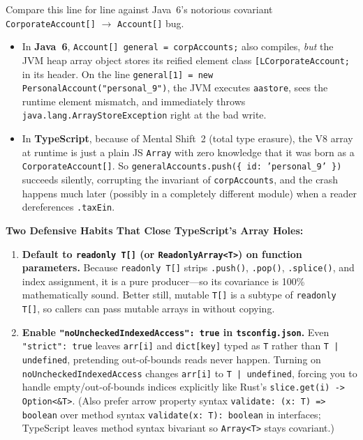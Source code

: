 Compare this line for line against Java~6's notorious covariant \texttt{CorporateAccount[]} $\to$ \texttt{Account[]} bug.
\begin{itemize}
  \item In \textbf{Java~6}, \texttt{Account[] general = corpAccounts;} also compiles, \emph{but} the JVM heap array object stores its reified element class \texttt{[LCorporateAccount;} in its header. On the line \texttt{general[1] = new PersonalAccount("personal\_9")}, the JVM executes \texttt{aastore}, sees the runtime element mismatch, and immediately throws \texttt{java.lang.ArrayStoreException} right at the bad write.
  \item In \textbf{TypeScript}, because of Mental Shift~2 (total type erasure), the V8 array at runtime is just a plain JS \texttt{Array} with zero knowledge that it was born as a \texttt{CorporateAccount[]}. So \texttt{generalAccounts.push(\{ id: 'personal\_9' \})} succeeds silently, corrupting the invariant of \texttt{corpAccounts}, and the crash happens much later (possibly in a completely different module) when a reader dereferences \texttt{.taxEin}.
\end{itemize}

\begin{trapbox}
\textbf{Two Defensive Habits That Close TypeScript's Array Holes:}
\begin{enumerate}
  \item \textbf{Default to \texttt{readonly T[]} (or \texttt{ReadonlyArray<T>}) on function parameters.} Because \texttt{readonly T[]} strips \texttt{.push()}, \texttt{.pop()}, \texttt{.splice()}, and index assignment, it is a pure producer---so its covariance is 100\% mathematically sound. Better still, mutable \texttt{T[]} is a subtype of \texttt{readonly T[]}, so callers can pass mutable arrays in without copying.
  \item \textbf{Enable \texttt{"noUncheckedIndexedAccess": true} in \texttt{tsconfig.json}.} Even \texttt{"strict": true} leaves \texttt{arr[i]} and \texttt{dict[key]} typed as \texttt{T} rather than \texttt{T | undefined}, pretending out-of-bounds reads never happen. Turning on \texttt{noUncheckedIndexedAccess} changes \texttt{arr[i]} to \texttt{T | undefined}, forcing you to handle empty/out-of-bounds indices explicitly like Rust's \texttt{slice.get(i) -> Option<\&T>}. (Also prefer arrow property syntax \texttt{validate: (x: T) => boolean} over method syntax \texttt{validate(x: T): boolean} in interfaces; TypeScript leaves method syntax bivariant so \texttt{Array<T>} stays covariant.)
\end{enumerate}
\end{trapbox}

